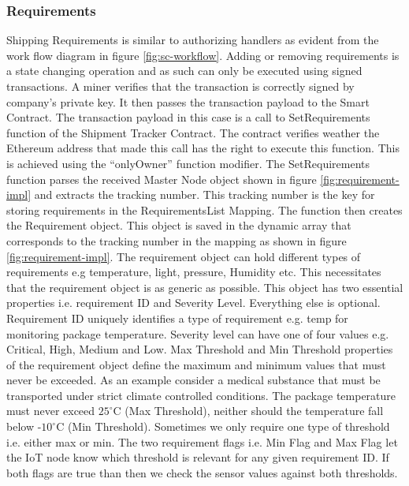 \subsubsection{Requirements}
Shipping Requirements is similar to authorizing handlers as evident from the work flow diagram in figure \ref{fig:sc-workflow}. Adding or removing requirements is a state changing operation and as such can only be executed using signed transactions. A miner verifies that the transaction is correctly signed by company’s private key. It then passes the transaction payload to the Smart Contract. The transaction payload in this case is a call to SetRequirements function of the Shipment Tracker Contract. The contract verifies weather the Ethereum address that made this call has the right to execute this function. This is achieved using the “onlyOwner” function modifier.  The SetRequirements function parses the received Master Node object shown in figure \ref{fig:requirement-impl} and extracts the tracking number. This tracking number is the key for storing requirements in the RequirementsList Mapping. The function then creates the Requirement object. This object is saved in the dynamic array that corresponds to the tracking number in the mapping as shown in figure  \ref{fig:requirement-impl}. The requirement object can hold different types of requirements e.g temperature, light, pressure, Humidity etc. This necessitates that the requirement object is as generic as possible. This object has two essential properties i.e. requirement ID and Severity Level. Everything else is optional. Requirement ID uniquely identifies a type of requirement e.g. temp for monitoring package temperature. Severity level can have one of four values e.g. Critical, High, Medium and Low. Max Threshold and Min Threshold properties of the requirement object define the maximum and minimum values that must never be exceeded. As an example consider a medical substance that must be transported under strict climate controlled conditions. The package temperature must never exceed $25^\circ$C (Max Threshold), neither should the temperature fall below -$10^\circ$C (Min Threshold). Sometimes we only require one type of threshold i.e. either max or min. The two requirement flags i.e. Min Flag and Max Flag let the IoT node know which threshold is relevant for any given requirement ID. If both flags are true than then we check the sensor values against both thresholds.  

